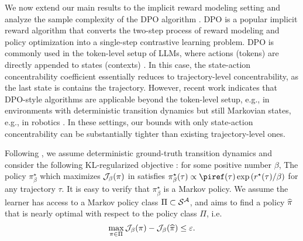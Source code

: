 \documentclass{article}
\newcommand{\arxiv}[1]{\iftoggle{icml}{}{#1}}
\newcommand{\icml}[1]{\iftoggle{icml}{#1}{}}
\begin{document}
We now extend our main results to the implicit reward modeling setting and analyze the sample complexity of the DPO algorithm \citep{rafailov2023direct}. DPO is a popular implicit reward algorithm that converts the two-step process of reward modeling and policy optimization into a single-step contrastive learning problem. DPO is commonly used in the token-level setup of LLMs, where actions (tokens) are directly appended to states (contexts) \citep{rafailov2023direct,rafailov2024r}. In this case, the state-action concentrability coefficient essentially reduces to trajectory-level concentrability, as the last state is contains the trajectory.
However, recent work indicates that DPO-style algorithms are  applicable beyond the token-level setup, e.g., in environments with deterministic transition dynamics but still Markovian states, e.g., in robotics \citep{hejna2023contrastive,xie2024exploratory}. In these settings, our bounds with only state-action concentrability can be substantially tighter than existing trajectory-level ones.


Following \citet{xie2024exploratory}, we assume deterministic ground-truth transition dynamics and consider the following KL-regularized objective \citep{xiong2023gibbs, ye2024theoretical,xie2024exploratory}: for some positive number $\beta$,
\arxiv{
\begin{equation}\label{eq: def-J-beta}
    \Jbeta(\pi) \coloneqq J(\pi) - \beta\KL(\pi(\tau)\ \|\ \piref(\tau)) = \EE_{\tau\sim \pi}\left[r^\star(\tau) - \beta\log\frac{\pi(\tau)}{\piref(\tau)}\right].
\end{equation}
}
\icml{
\begin{equation}\label{eq: def-J-beta}
\begin{aligned}
    \Jbeta(\pi) \coloneqq &~ J_{r}(\pi) - \beta\KL(\pi(\tau)\ \|\ \piref(\tau))\\
    = &~ \EE_{\tau\sim \pi}\left[r(\tau) - \beta\log\frac{\pi(\tau)}{\piref(\tau)}\right].
\end{aligned}
\end{equation}
}
The policy $\pi_\beta^\star$ which maximizes $\mathcal{J}_\beta(\pi)$ in  satisfies $\pi_\beta^\star(\tau)\propto \piref(\tau)\exp\left(r^\star(\tau) / \beta\right)$ for any trajectory $\tau$. It is easy to verify that $\pi_\beta^\star$ is a Markov policy. We assume the learner has access to a Markov policy class $\Pi\subset \mathcal{S}^{\mathcal{A}}$, and aims to find a policy $\widehat{\pi}$ that is nearly optimal with respect to the policy class $\Pi$, i.e.
$$\max_{\pi\in \Pi} \mathcal{J}_\beta(\pi) - \mathcal{J}_\beta(\widehat{\pi})\le \varepsilon.$$
\end{document}
